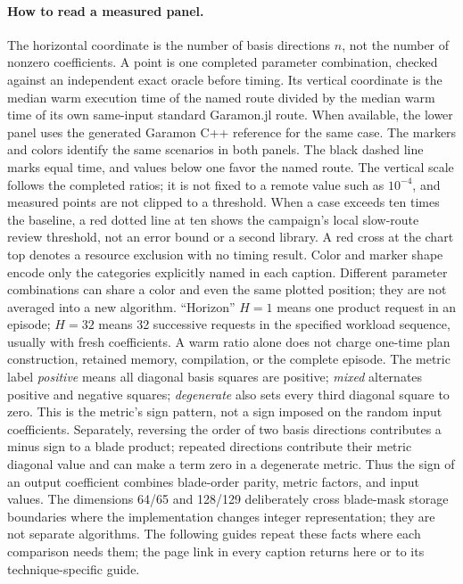 \documentclass[11pt,a4paper]{article}
\begin{document}
\paragraph{How to read a measured panel.}
The horizontal coordinate is the number of basis directions \(n\), not
the number of nonzero coefficients. A point is one completed parameter
combination, checked against an independent exact oracle before timing.
Its vertical coordinate is the median warm execution time of the named
route divided by the median warm time of its own same-input standard
Garamon.jl route. When available, the lower panel uses the generated
Garamon C++ reference for the same case. The markers and colors identify
the same scenarios in both panels. The black dashed line marks equal
time, and values below one favor the named route. The vertical scale follows
the completed ratios; it is not fixed to a remote value such as
\(10^{-4}\), and measured points are not clipped to a threshold.
When a case exceeds ten times the baseline, a red dotted line at ten
shows the campaign's local slow-route review threshold, not an error
bound or a second library. A red cross at the chart top denotes a
resource exclusion with no timing result.
Color and marker shape encode only the categories explicitly named in
each caption. Different parameter combinations can share a color and
even the same plotted position; they are not averaged into a new
algorithm. ``Horizon'' \(H=1\) means one product request in an episode;
\(H=32\) means 32 successive requests in the specified workload
sequence, usually with fresh coefficients. A warm ratio alone does not
charge one-time plan construction, retained memory, compilation, or the complete
episode. The metric label \emph{positive} means all diagonal basis
squares are positive; \emph{mixed} alternates positive and negative
squares; \emph{degenerate} also sets every third diagonal square to
zero. This is the metric's sign pattern, not a sign imposed on the
random input coefficients. Separately, reversing the order of two
basis directions contributes a minus sign to a blade product; repeated
directions contribute their metric diagonal value and can make a term
zero in a degenerate metric. Thus the sign of an output coefficient
combines blade-order parity, metric factors, and input values. The
dimensions 64/65 and 128/129 deliberately cross blade-mask storage
boundaries where the implementation changes integer representation;
they are not separate algorithms. The following guides repeat these facts
where each comparison needs them; the page link in every caption
returns here or to its technique-specific guide.
\end{document}
